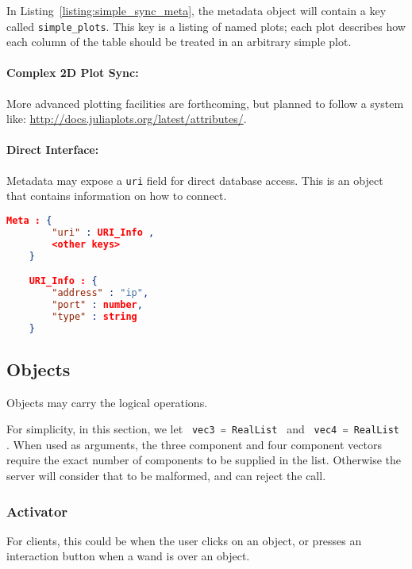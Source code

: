 \documentclass[11pt, oneside]{amsart}
\begin{document}
In Listing~\ref{listing:simple_sync_meta}, the metadata object will contain a key called \texttt{simple\_plots}. This key is a listing of named plots; each plot describes how each column of the table should be treated in an arbitrary simple plot.

\paragraph{Complex 2D Plot Sync:} More advanced plotting facilities are forthcoming, but planned to follow a system like:
\url{http://docs.juliaplots.org/latest/attributes/}.

\paragraph{Direct Interface:} Metadata may expose a \texttt{uri} field for direct database access. This is an object that contains information on how to connect.

\begin{lstlisting}[language=json, label=listing:simple_db_meta, caption=Table URI Field ]
	Meta : {
		"uri" : URI_Info ,
		<other keys>
	}

	URI_Info : {
		"address" : "ip",
		"port" : number,
		"type" : string
	}

\end{lstlisting}


\subsection{Objects}
\label{sec:obj_cap}

Objects may carry the logical operations.

For simplicity, in this section, we let \lstinline[language=c++]| vec3 = RealList | and \lstinline[language=c++]| vec4 = RealList |. When used as arguments, the three component and four component vectors require the exact number of components to be supplied in the list. Otherwise the server will consider that to be malformed, and can reject the call.

\subsubsection{Activator}

For clients, this could be when the user clicks on an object, or presses an interaction button when a wand is over an object.


\end{document}
